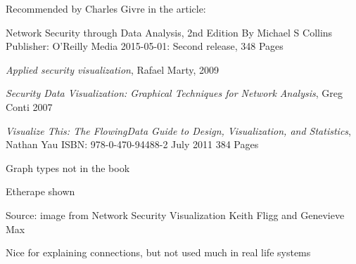\documentclass[Screen16to9,17pt]{foils}
\begin{document}
Recommended by Charles Givre in the article:\\




Network Security through Data Analysis, 2nd Edition
By Michael S Collins
Publisher: O'Reilly Media
2015-05-01: Second release, 348 Pages

\begin{list2}
\item \emph{Applied security visualization}, Rafael Marty, 2009
\item \emph{Security Data Visualization: Graphical Techniques for Network Analysis}, Greg Conti 2007
\item \emph{Visualize This: The FlowingData Guide to Design, Visualization, and Statistics}, Nathan Yau
ISBN: 978-0-470-94488-2 July 2011 384 Pages
\end{list2}





\begin{list2}
  \item Graph types not in the book
  \item Etherape shown
\end{list2}



Source: image from Network Security Visualization Keith Fligg and Genevieve Max\\

\begin{list2}
\item {}
\item Nice for explaining connections, but not used much in real life systems
\end{list2}






\end{document}
